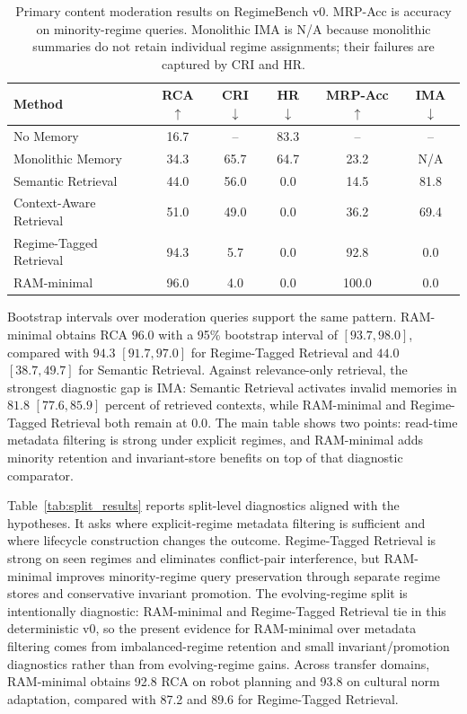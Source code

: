 \documentclass{article} %
\begin{document}
\begin{table}[t]
\centering
\small
\begin{tabular}{lccccc}
\toprule
\textbf{Method} &
\textbf{RCA $\uparrow$} &
\textbf{CRI $\downarrow$} &
\textbf{HR $\downarrow$} &
\textbf{MRP-Acc $\uparrow$} &
\textbf{IMA $\downarrow$} \\
\midrule
No Memory & 16.7 & -- & 83.3 & -- & -- \\
Monolithic Memory & 34.3 & 65.7 & 64.7 & 23.2 & N/A \\
Semantic Retrieval & 44.0 & 56.0 & 0.0 & 14.5 & 81.8 \\
Context-Aware Retrieval & 51.0 & 49.0 & 0.0 & 36.2 & 69.4 \\
Regime-Tagged Retrieval & 94.3 & 5.7 & 0.0 & 92.8 & 0.0 \\
RAM-minimal & 96.0 & 4.0 & 0.0 & 100.0 & 0.0 \\
\bottomrule
\end{tabular}
\caption{Primary content moderation results on RegimeBench v0. MRP-Acc is accuracy on minority-regime queries. Monolithic IMA is N/A because monolithic summaries do not retain individual regime assignments; their failures are captured by CRI and HR.}
\label{tab:main_results_template}
\end{table}

Bootstrap intervals over moderation queries support the same pattern.
RAM-minimal obtains RCA $96.0$ with a 95\% bootstrap interval of $[93.7,98.0]$, compared with $94.3$ $[91.7,97.0]$ for Regime-Tagged Retrieval and $44.0$ $[38.7,49.7]$ for Semantic Retrieval.
Against relevance-only retrieval, the strongest diagnostic gap is IMA: Semantic Retrieval activates invalid memories in $81.8$ $[77.6,85.9]$ percent of retrieved contexts, while RAM-minimal and Regime-Tagged Retrieval both remain at $0.0$.
The main table shows two points: read-time metadata filtering is strong under explicit regimes, and RAM-minimal adds minority retention and invariant-store benefits on top of that diagnostic comparator.

Table~\ref{tab:split_results} reports split-level diagnostics aligned with the hypotheses.
It asks where explicit-regime metadata filtering is sufficient and where lifecycle construction changes the outcome.
Regime-Tagged Retrieval is strong on seen regimes and eliminates conflict-pair interference, but RAM-minimal improves minority-regime query preservation through separate regime stores and conservative invariant promotion.
The evolving-regime split is intentionally diagnostic: RAM-minimal and Regime-Tagged Retrieval tie in this deterministic v0, so the present evidence for RAM-minimal over metadata filtering comes from imbalanced-regime retention and small invariant/promotion diagnostics rather than from evolving-regime gains.
Across transfer domains, RAM-minimal obtains 92.8 RCA on robot planning and 93.8 on cultural norm adaptation, compared with 87.2 and 89.6 for Regime-Tagged Retrieval.
\end{document}
